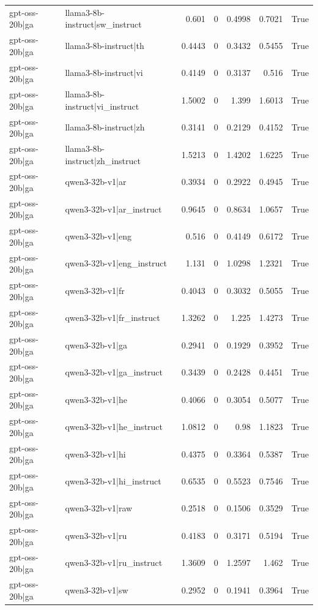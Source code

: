 \begin{table}
\begin{tabular}{l l r r r r l}
gpt-oss-20b|ga & llama3-8b-instruct|sw_instruct & 0.601 & 0 & 0.4998 & 0.7021 & True \\
gpt-oss-20b|ga & llama3-8b-instruct|th & 0.4443 & 0 & 0.3432 & 0.5455 & True \\
gpt-oss-20b|ga & llama3-8b-instruct|vi & 0.4149 & 0 & 0.3137 & 0.516 & True \\
gpt-oss-20b|ga & llama3-8b-instruct|vi_instruct & 1.5002 & 0 & 1.399 & 1.6013 & True \\
gpt-oss-20b|ga & llama3-8b-instruct|zh & 0.3141 & 0 & 0.2129 & 0.4152 & True \\
gpt-oss-20b|ga & llama3-8b-instruct|zh_instruct & 1.5213 & 0 & 1.4202 & 1.6225 & True \\
gpt-oss-20b|ga & qwen3-32b-v1|ar & 0.3934 & 0 & 0.2922 & 0.4945 & True \\
gpt-oss-20b|ga & qwen3-32b-v1|ar_instruct & 0.9645 & 0 & 0.8634 & 1.0657 & True \\
gpt-oss-20b|ga & qwen3-32b-v1|eng & 0.516 & 0 & 0.4149 & 0.6172 & True \\
gpt-oss-20b|ga & qwen3-32b-v1|eng_instruct & 1.131 & 0 & 1.0298 & 1.2321 & True \\
gpt-oss-20b|ga & qwen3-32b-v1|fr & 0.4043 & 0 & 0.3032 & 0.5055 & True \\
gpt-oss-20b|ga & qwen3-32b-v1|fr_instruct & 1.3262 & 0 & 1.225 & 1.4273 & True \\
gpt-oss-20b|ga & qwen3-32b-v1|ga & 0.2941 & 0 & 0.1929 & 0.3952 & True \\
gpt-oss-20b|ga & qwen3-32b-v1|ga_instruct & 0.3439 & 0 & 0.2428 & 0.4451 & True \\
gpt-oss-20b|ga & qwen3-32b-v1|he & 0.4066 & 0 & 0.3054 & 0.5077 & True \\
gpt-oss-20b|ga & qwen3-32b-v1|he_instruct & 1.0812 & 0 & 0.98 & 1.1823 & True \\
gpt-oss-20b|ga & qwen3-32b-v1|hi & 0.4375 & 0 & 0.3364 & 0.5387 & True \\
gpt-oss-20b|ga & qwen3-32b-v1|hi_instruct & 0.6535 & 0 & 0.5523 & 0.7546 & True \\
gpt-oss-20b|ga & qwen3-32b-v1|raw & 0.2518 & 0 & 0.1506 & 0.3529 & True \\
gpt-oss-20b|ga & qwen3-32b-v1|ru & 0.4183 & 0 & 0.3171 & 0.5194 & True \\
gpt-oss-20b|ga & qwen3-32b-v1|ru_instruct & 1.3609 & 0 & 1.2597 & 1.462 & True \\
gpt-oss-20b|ga & qwen3-32b-v1|sw & 0.2952 & 0 & 0.1941 & 0.3964 & True \\

\end{tabular}
\end{table}
